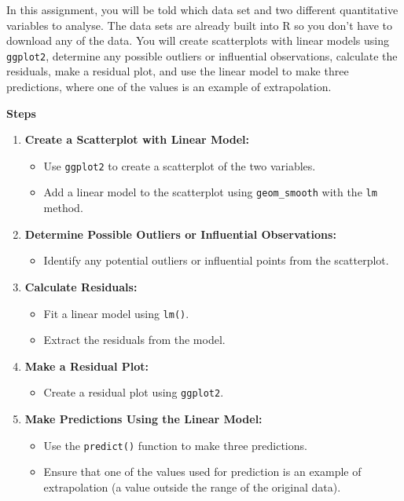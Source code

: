 \documentclass[
  letterpaper,
  DIV=11,
  numbers=noendperiod]{scrreprt}
\providecommand{\tightlist}{%
  \setlength{\itemsep}{0pt}\setlength{\parskip}{0pt}}\usepackage{longtable,booktabs,array}
\begin{document}

In this assignment, you will be told which data set and two different
quantitative variables to analyse. The data sets are already built into
R so you don't have to download any of the data. You will create
scatterplots with linear models using \texttt{ggplot2}, determine any
possible outliers or influential observations, calculate the residuals,
make a residual plot, and use the linear model to make three
predictions, where one of the values is an example of extrapolation.

\textbf{Steps}

\begin{enumerate}
\def\labelenumi{\arabic{enumi}.}
\tightlist
\item
  \textbf{Create a Scatterplot with Linear Model:}

  \begin{itemize}
  \tightlist
  \item
    Use \texttt{ggplot2} to create a scatterplot of the two variables.
  \item
    Add a linear model to the scatterplot using \texttt{geom\_smooth}
    with the \texttt{lm} method.
  \end{itemize}
\item
  \textbf{Determine Possible Outliers or Influential Observations:}

  \begin{itemize}
  \tightlist
  \item
    Identify any potential outliers or influential points from the
    scatterplot.
  \end{itemize}
\item
  \textbf{Calculate Residuals:}

  \begin{itemize}
  \tightlist
  \item
    Fit a linear model using \texttt{lm()}.
  \item
    Extract the residuals from the model.
  \end{itemize}
\item
  \textbf{Make a Residual Plot:}

  \begin{itemize}
  \tightlist
  \item
    Create a residual plot using \texttt{ggplot2}.
  \end{itemize}
\item
  \textbf{Make Predictions Using the Linear Model:}

  \begin{itemize}
  \tightlist
  \item
    Use the \texttt{predict()} function to make three predictions.
  \item
    Ensure that one of the values used for prediction is an example of
    extrapolation (a value outside the range of the original data).
  \end{itemize}
\end{enumerate}
\end{document}
